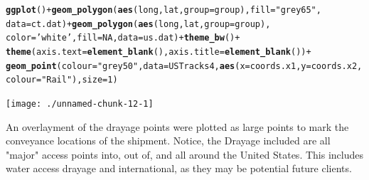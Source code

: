 \documentclass{article}\usepackage[]{graphicx}\usepackage[]{color}
\makeatletter
\newcommand{\hlnum}[1]{\textcolor[rgb]{0.686,0.059,0.569}{#1}}%
\newcommand{\hlstr}[1]{\textcolor[rgb]{0.192,0.494,0.8}{#1}}%
\newcommand{\hlopt}[1]{\textcolor[rgb]{0,0,0}{#1}}%
\newcommand{\hlstd}[1]{\textcolor[rgb]{0.345,0.345,0.345}{#1}}%
\newcommand{\hlkwc}[1]{\textcolor[rgb]{0.333,0.667,0.333}{#1}}%
\newcommand{\hlkwd}[1]{\textcolor[rgb]{0.737,0.353,0.396}{\textbf{#1}}}%
\newenvironment{kframe}{%
 \def\at@end@of@kframe{}%
 \ifinner\ifhmode%
  \def\at@end@of@kframe{\end{minipage}}%
  \begin{minipage}{\columnwidth}%
 \fi\fi%
 \def\FrameCommand##1{\hskip\@totalleftmargin \hskip-\fboxsep
 \colorbox{shadecolor}{##1}\hskip-\fboxsep
     \hskip-\linewidth \hskip-\@totalleftmargin \hskip\columnwidth}%
 \MakeFramed {\advance\hsize-\width
   \@totalleftmargin\z@ \linewidth\hsize
   \@setminipage}}%
 {\par\unskip\endMakeFramed%
 \at@end@of@kframe}
\newenvironment{knitrout}{}{} %
\makeatother
\begin{document}
\begin{knitrout}
\color{fgcolor}\begin{kframe}
\begin{alltt}
\hlkwd{ggplot}\hlstd{()} \hlopt{+} \hlkwd{geom_polygon}\hlstd{(}\hlkwd{aes}\hlstd{(long,lat,} \hlkwc{group}\hlstd{=group),} \hlkwc{fill}\hlstd{=}\hlstr{"grey65"}\hlstd{,}
  \hlkwc{data}\hlstd{=ct.dat)} \hlopt{+} \hlkwd{geom_polygon}\hlstd{(}\hlkwd{aes}\hlstd{(long,lat,} \hlkwc{group}\hlstd{=group),}
  \hlkwc{color}\hlstd{=}\hlstr{'white'}\hlstd{,} \hlkwc{fill}\hlstd{=}\hlnum{NA}\hlstd{,} \hlkwc{data}\hlstd{=us.dat)} \hlopt{+} \hlkwd{theme_bw}\hlstd{()} \hlopt{+}
  \hlkwd{theme}\hlstd{(}\hlkwc{axis.text} \hlstd{=} \hlkwd{element_blank}\hlstd{(),} \hlkwc{axis.title}\hlstd{=}\hlkwd{element_blank}\hlstd{())} \hlopt{+}
  \hlkwd{geom_point}\hlstd{(}\hlkwc{colour}\hlstd{=}\hlstr{"grey50"}\hlstd{,}\hlkwc{data}\hlstd{=USTracks4,} \hlkwd{aes}\hlstd{(}\hlkwc{x}\hlstd{=coords.x1,}\hlkwc{y}\hlstd{=coords.x2,}\hlkwc{colour}\hlstd{=}\hlstr{"Rail"}\hlstd{),} \hlkwc{size} \hlstd{=} \hlnum{1}\hlstd{)}
\end{alltt}
\end{kframe}

{\centering \texttt{[image: ./unnamed-chunk-12-1]} 

}



\end{knitrout}
\newpage

An overlayment of the drayage points were plotted as large points to mark the conveyance locations of the shipment. Notice, the Drayage included are all "major" access points into, out of, and all around the United States. This includes water access drayage and international, as they may be potential future clients. \\
\end{document}
